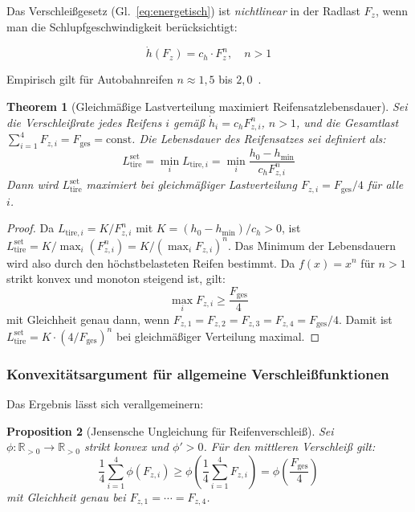 ﻿\documentclass[12pt,a4paper]{article}
\newtheorem{theorem}{Theorem}[section]
\newtheorem{proposition}[theorem]{Proposition}
\theoremstyle{definition}
\theoremstyle{remark}
\newcommand{\Ltire}{L_{\mathrm{tire}}}
\newcommand{\Fz}{F_z}
\newcommand{\R}{\mathbb{R}}
\begin{document}
Das Verschleißgesetz (Gl.~\ref{eq:energetisch}) ist \emph{nichtlinear} in der
Radlast $\Fz$, wenn man die Schlupfgeschwindigkeit berücksichtigt:

\begin{equation}
  \dot{h}(\Fz) = c_h \cdot \Fz^n, \quad n > 1
  \label{eq:wear_fz}
\end{equation}

Empirisch gilt für Autobahnreifen $n \approx 1{,}5$ bis $2{,}0$~\cite{Niskanen2014,
Williams1955}.

\begin{theorem}[Gleichmäßige Lastverteilung maximiert Reifensatzlebensdauer]
\label{thm:load_even}
Sei die Verschleißrate jedes Reifens $i$ gemäß $\dot{h}_i = c_h F_{z,i}^n$,
$n > 1$, und die Gesamtlast $\sum_{i=1}^4 F_{z,i} = F_{\mathrm{ges}} = \mathrm{const}$.
Die Lebensdauer des Reifensatzes sei definiert als:
\begin{equation}
  \Ltire^{\mathrm{set}} = \min_i L_{\mathrm{tire},i}
                        = \min_i \frac{h_0 - h_{\min}}{c_h F_{z,i}^n}
  \label{eq:life_set}
\end{equation}
Dann wird $\Ltire^{\mathrm{set}}$ maximiert bei gleichmäßiger Lastverteilung
$F_{z,i} = F_{\mathrm{ges}} / 4$ für alle $i$.
\end{theorem}

\begin{proof}
Da $L_{\mathrm{tire},i} = K / F_{z,i}^n$ mit $K = (h_0 - h_{\min}) / c_h > 0$, ist
$\Ltire^{\mathrm{set}} = K / \max_i(F_{z,i}^n) = K / (\max_i F_{z,i})^n$.
Das Minimum der Lebensdauern wird also durch den höchstbelasteten Reifen
bestimmt. Da $f(x) = x^n$ für $n > 1$ strikt konvex und monoton steigend ist,
gilt:
\begin{equation}
  \max_i F_{z,i} \geq \frac{F_{\mathrm{ges}}}{4}
\end{equation}
mit Gleichheit genau dann, wenn $F_{z,1} = F_{z,2} = F_{z,3} = F_{z,4} = F_{\mathrm{ges}}/4$.
Damit ist $\Ltire^{\mathrm{set}} = K \cdot (4/F_{\mathrm{ges}})^n$ bei
gleichmäßiger Verteilung maximal.
\end{proof}

\subsubsection{Konvexitätsargument für allgemeine Verschleißfunktionen}

Das Ergebnis lässt sich verallgemeinern:

\begin{proposition}[Jensensche Ungleichung für Reifenverschleiß]
\label{prop:jensen}
Sei $\phi : \R_{>0} \to \R_{>0}$ strikt konvex und $\phi' > 0$.
Für den mittleren Verschleiß gilt:
\begin{equation}
  \frac{1}{4}\sum_{i=1}^4 \phi(F_{z,i}) \geq \phi\!\left(\frac{1}{4}\sum_{i=1}^4 F_{z,i}\right)
    = \phi\!\left(\frac{F_{\mathrm{ges}}}{4}\right)
  \label{eq:jensen}
\end{equation}
mit Gleichheit genau bei $F_{z,1} = \cdots = F_{z,4}$.
\end{proposition}
\end{document}

